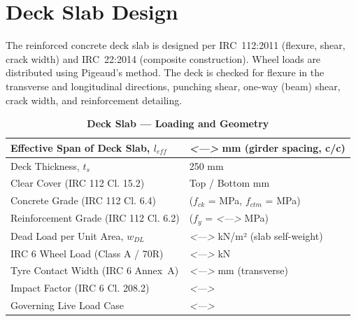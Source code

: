 \documentclass[12pt,a4paper]{report}
\numberwithin{table}{chapter}
\numberwithin{figure}{chapter}
\newcommand{\placeholder}[1]{\textit{\textless #1\textgreater}}
\begin{document}
\section{Deck Slab Design}
\label{sec:deck-design}

The reinforced concrete deck slab is designed per IRC~112:2011 (flexure, shear, crack width) and IRC~22:2014 (composite construction). Wheel loads are distributed using Pigeaud's method. The deck is checked for flexure in the transverse and longitudinal directions, punching shear, one-way (beam) shear, crack width, and reinforcement detailing.

\vspace{1em}
\begin{longtable}{|L{5.5cm}|p{10.0cm}|}
\caption{\textbf{Deck Slab --- Loading and Geometry}}
\hline
\textnormal{Effective Span of Deck Slab, $l_{eff}$} & \placeholder{---} mm (girder spacing, c/c) \\[6pt]
\hline
\textnormal{Deck Thickness, $t_s$} & 250 mm \\[6pt]
\hline
\textnormal{Clear Cover (IRC 112 Cl. 15.2)} & Top  / Bottom  mm \\[6pt]
\hline
\textnormal{Concrete Grade (IRC 112 Cl. 6.4)} &  ($f_{ck}$ =  MPa, $f_{ctm}$ =  MPa) \\[6pt]
\hline
\textnormal{Reinforcement Grade (IRC 112 Cl. 6.2)} &  ($f_y$ = \placeholder{---} MPa) \\[6pt]
\hline
\textnormal{Dead Load per Unit Area, $w_{DL}$} & \placeholder{---} kN/m² (slab self-weight) \\[6pt]
\hline
\textnormal{IRC 6 Wheel Load (Class A / 70R)} & \placeholder{---} kN \\[6pt]
\hline
\textnormal{Tyre Contact Width (IRC 6 Annex~A)} & \placeholder{---} mm (transverse) \\[6pt]
\hline
\textnormal{Impact Factor (IRC 6 Cl. 208.2)} & \placeholder{---} \\[6pt]
\hline
\textnormal{Governing Live Load Case} & \placeholder{---} \\[6pt]
\hline
\end{longtable}
\end{document}
